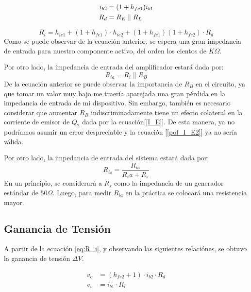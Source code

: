 \begin{align*}
    i_{b2} &= (1+h_{fe1}) i_{b1} \\
    \vspace{1mm}
    R_d &= R_E \parallel R_L
\end{align*}

\begin{equation}
    R_i = h_{ie1} + (1 + h_{fe1})\cdot h_{ie2} + (1 + h_{fe1})(1+h_{fe2})\cdot R_d
    \label{eq:R_i}
\end{equation}
\vspace{2mm}
Como se puede observar de la ecuación anterior, se espera una gran impedancia de entrada para nuestro componente activo,
del orden los cientos de $K\Omega$.
\vspace{2mm}

Por otro lado, la impedancia de entrada del amplificador estará dada por:
\begin{equation}
    R_{ia}=R_i \parallel R_B
    \label{R_ia}
\end{equation}
De la ecuación anterior se puede observar la importancia de $R_B$ en el circuito, ya que tomar un valor muy bajo 
me traería aparejada una gran pérdida en la impedancia de entrada de mi dispositivo. Sin embargo, también es 
necesario considerar que aumentar $R_B$ indiscriminadamente tiene un efecto colateral en la corriente de emisor 
de $Q_2$ dada por la ecuación[\ref{I_E}]. De esta manera, ya no podríamos asumir un error despreciable y la 
ecuación [\ref{pol_I_E2}] ya no sería válida. \par 
Por otro lado, la impedancia de entrada del sistema estará dada por:
\begin{equation}
    R_{is}=\frac{R_{ia}}{R_ia+R_s}
    \label{R_is}
\end{equation}
En un principio, se considerará a $R_s$ como la impedancia de un generador estándar de $50\Omega$. Luego, para medir 
$R_{ia}$ en la práctica se colocará una resistencia mayor.

\subsection{Ganancia de Tensión}
A partir de la ecuación \eqref{eq:R_i}, y observando las siguientes relaciónes, se obtuvo la ganancia de tensión $\Delta V$.

\begin{align*}
    v_o &= (h_{fe2}+1)\cdot i_{b2}\cdot R_d \\
    v_i &= i_{b1} \cdot R_i
\end{align*}

